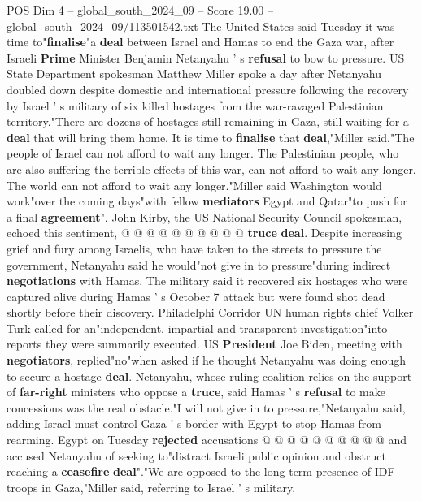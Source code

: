 \begin{textsample}{POS Dim 4 – global\_south\_2024\_09 – Score 19.00 – global\_south\_2024\_09/113501542.txt}  \label{ex:f4_pos_276}
The United States said Tuesday it was time to"\textbf{finalise}"a \textbf{deal} between Israel and Hamas to end the Gaza war, after Israeli \textbf{Prime} Minister Benjamin Netanyahu ' s \textbf{refusal} to bow to pressure.
US State Department spokesman Matthew Miller spoke a day after Netanyahu doubled down despite domestic and international pressure following the recovery by Israel ' s military of six killed hostages from the war-ravaged Palestinian territory."There are dozens of hostages still remaining in Gaza, still waiting for a \textbf{deal} that will bring them home.
It is time to \textbf{finalise} that \textbf{deal},"Miller said."The people of Israel can not afford to wait any longer.
The Palestinian people, who are also suffering the terrible effects of this war, can not afford to wait any longer.
The world can not afford to wait any longer."Miller said Washington would work"over the coming days"with fellow \textbf{mediators} Egypt and Qatar"to push for a final \textbf{agreement}".
John Kirby, the US National Security Council spokesman, echoed this sentiment, @ @ @ @ @ @ @ @ @ @ \textbf{truce} \textbf{deal}.
Despite increasing grief and fury among Israelis, who have taken to the streets to pressure the government, Netanyahu said he would"not give in to pressure"during indirect \textbf{negotiations} with Hamas.
The military said it recovered six hostages who were captured alive during Hamas ' s October 7 attack but were found shot dead shortly before their discovery.
Philadelphi Corridor UN human rights chief Volker Turk called for an"independent, impartial and transparent investigation"into reports they were summarily executed.
US \textbf{President} Joe Biden, meeting with \textbf{negotiators}, replied"no"when asked if he thought Netanyahu was doing enough to secure a hostage \textbf{deal}.
Netanyahu, whose ruling coalition relies on the support of \textbf{far-right} ministers who oppose a \textbf{truce}, said Hamas ' s \textbf{refusal} to make concessions was the real obstacle."I will not give in to pressure,"Netanyahu said, adding Israel must control Gaza ' s border with Egypt to stop Hamas from rearming.
Egypt on Tuesday \textbf{rejected} accusations @ @ @ @ @ @ @ @ @ @ and accused Netanyahu of seeking to"distract Israeli public opinion and obstruct reaching a \textbf{ceasefire} \textbf{deal}"."We are opposed to the long-term presence of IDF troops in Gaza,"Miller said, referring to Israel ' s military.

\end{textsample}
